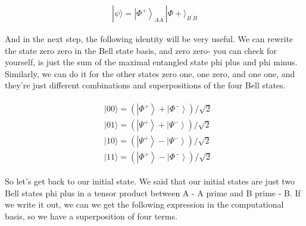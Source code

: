 \begin{align}
    |\psi\rangle=\left|\Phi^{+}\right\rangle_{A A^{\prime}}|\Phi+\rangle_{B^{\prime} B}
\end{align}

And in the next step, the following identity will be very useful. We can rewrite the state zero zero in the Bell state basis, and zero zero- you can check for yourself, is just the sum of the maximal entangled state phi plus and phi minus. Similarly, we can do it for the other states zero one, one zero, and one one, and they're just different combinations and superpositions of the four Bell states.

\begin{align}
    \begin{aligned}
&|00\rangle=\left(\left|\Phi^{+}\right\rangle+\left|\Phi^{-}\right\rangle\right) / \sqrt{2} \\
&|01\rangle=\left(\left|\Psi^{+}\right\rangle+\left|\Psi^{-}\right\rangle\right) / \sqrt{2} \\
&|10\rangle=\left(\left|\Psi^{+}\right\rangle-\left|\Psi^{-}\right\rangle\right) / \sqrt{2} \\
&|11\rangle=\left(\left|\Phi^{+}\right\rangle-\left|\Phi^{-}\right\rangle\right) / \sqrt{2}
\end{aligned}
\end{align}

So let's get back to our initial state. We said that our initial states are just two Bell states phi plus in a tensor product between A - A prime and B prime - B. If we write it out, we can we get the following expression in the computational basis, so we have a superposition of four terms. 

